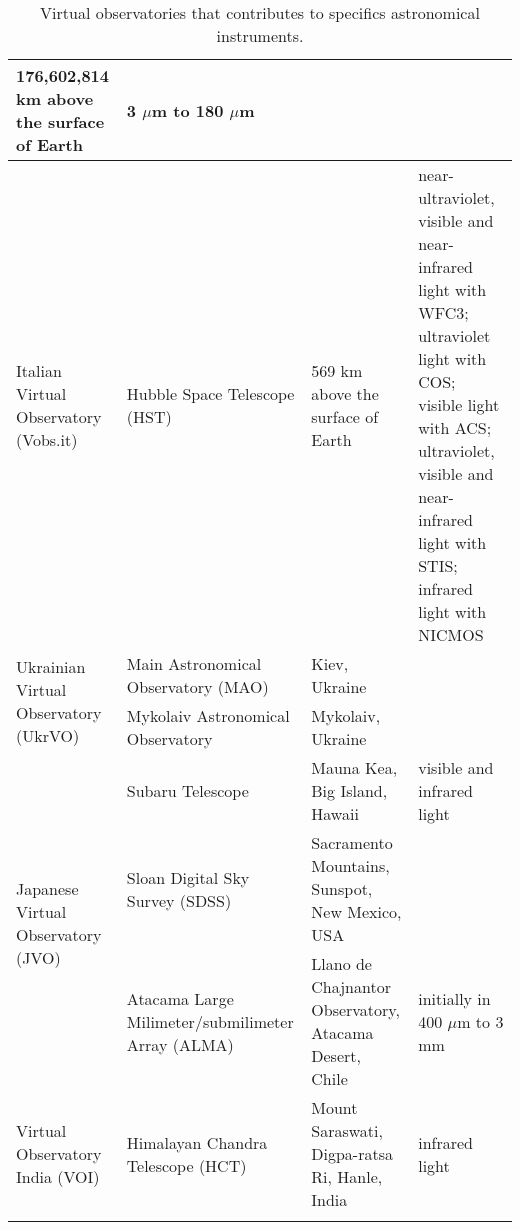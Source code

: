 \begin{center}
\begin{longtable}{|m{3cm}|m{3cm}|m{3cm}|m{5cm}|}
    176,602,814 km above the surface of Earth & 3 $ \mu $m to 180 $ \mu $m \\
    \hline
    Italian Virtual Observatory (Vobs.it) & Hubble Space Telescope (HST) & 569
    km above the surface of Earth & near-ultraviolet, visible and near-infrared
    light with WFC3; ultraviolet light with COS; visible light with ACS;
    ultraviolet, visible and near-infrared light with STIS; infrared light with
    NICMOS \\
    \hline
    \multirow{2}{3cm}{Ukrainian Virtual Observatory (UkrVO)} & Main Astronomical
    Observatory (MAO) & Kiev, Ukraine & \\
     \cline{2-4}
     & Mykolaiv Astronomical Observatory & Mykolaiv, Ukraine & \\
    \hline
    \multirow{3}{3cm}{Japanese Virtual Observatory (JVO)} & Subaru Telescope &
    Mauna Kea, Big Island, Hawaii & visible and infrared light
    \cite{website:Subaru_EMS} \\
     \cline{2-4}
     & Sloan Digital Sky Survey (SDSS) & Sacramento Mountains, Sunspot, New
     Mexico, USA & \\
     \cline{2-4} 
     & Atacama Large Milimeter/submilimeter Array (ALMA) & Llano de Chajnantor
     Observatory, Atacama Desert, Chile & initially in 400 $ \mu $m to 3 mm
     \cite{website:ALMA_EMS} \\
    \hline
    Virtual Observatory India (VOI) & Himalayan Chandra Telescope (HCT) & Mount
    Saraswati, Digpa-ratsa Ri, Hanle, India & infrared light 
    \cite{website:HCT_EMS} \\
    \hline
\caption{Virtual observatories that contributes to specifics astronomical
instruments.}
\label{table:vo_EMS}
\end{longtable}
\end{center}

